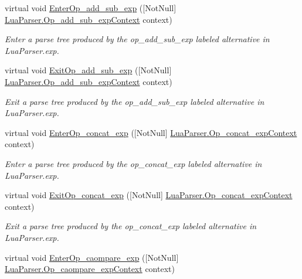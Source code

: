 \begin{DoxyCompactItemize}
virtual void \mbox{\hyperlink{classzlua_1_1_lua_base_listener_a8c58530fc93d6206a2308109ae86410e}{Enter\+Op\+\_\+add\+\_\+sub\+\_\+exp}} (\mbox{[}Not\+Null\mbox{]} \mbox{\hyperlink{classzlua_1_1_lua_parser_1_1_op__add__sub__exp_context}{Lua\+Parser.\+Op\+\_\+add\+\_\+sub\+\_\+exp\+Context}} context)
\begin{DoxyCompactList}\small\item\em Enter a parse tree produced by the {\ttfamily op\+\_\+add\+\_\+sub\+\_\+exp} labeled alternative in Lua\+Parser.\+exp. \end{DoxyCompactList}\item 
virtual void \mbox{\hyperlink{classzlua_1_1_lua_base_listener_a01605f22d70f39a286e5c768e347e788}{Exit\+Op\+\_\+add\+\_\+sub\+\_\+exp}} (\mbox{[}Not\+Null\mbox{]} \mbox{\hyperlink{classzlua_1_1_lua_parser_1_1_op__add__sub__exp_context}{Lua\+Parser.\+Op\+\_\+add\+\_\+sub\+\_\+exp\+Context}} context)
\begin{DoxyCompactList}\small\item\em Exit a parse tree produced by the {\ttfamily op\+\_\+add\+\_\+sub\+\_\+exp} labeled alternative in Lua\+Parser.\+exp. \end{DoxyCompactList}\item 
virtual void \mbox{\hyperlink{classzlua_1_1_lua_base_listener_afa38e97552715d422e07b0de65ea18b1}{Enter\+Op\+\_\+concat\+\_\+exp}} (\mbox{[}Not\+Null\mbox{]} \mbox{\hyperlink{classzlua_1_1_lua_parser_1_1_op__concat__exp_context}{Lua\+Parser.\+Op\+\_\+concat\+\_\+exp\+Context}} context)
\begin{DoxyCompactList}\small\item\em Enter a parse tree produced by the {\ttfamily op\+\_\+concat\+\_\+exp} labeled alternative in Lua\+Parser.\+exp. \end{DoxyCompactList}\item 
virtual void \mbox{\hyperlink{classzlua_1_1_lua_base_listener_a5daf4d3857a7580b51667c00c5395db1}{Exit\+Op\+\_\+concat\+\_\+exp}} (\mbox{[}Not\+Null\mbox{]} \mbox{\hyperlink{classzlua_1_1_lua_parser_1_1_op__concat__exp_context}{Lua\+Parser.\+Op\+\_\+concat\+\_\+exp\+Context}} context)
\begin{DoxyCompactList}\small\item\em Exit a parse tree produced by the {\ttfamily op\+\_\+concat\+\_\+exp} labeled alternative in Lua\+Parser.\+exp. \end{DoxyCompactList}\item 
virtual void \mbox{\hyperlink{classzlua_1_1_lua_base_listener_a9882ebd74c5ae33d72487bddb4f960ec}{Enter\+Op\+\_\+caompare\+\_\+exp}} (\mbox{[}Not\+Null\mbox{]} \mbox{\hyperlink{classzlua_1_1_lua_parser_1_1_op__caompare__exp_context}{Lua\+Parser.\+Op\+\_\+caompare\+\_\+exp\+Context}} context)

\end{DoxyCompactItemize}
